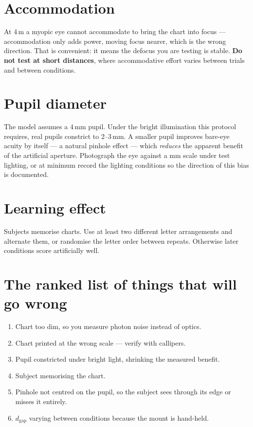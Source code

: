 \documentclass[11pt]{report}
\begin{document}
\section{Accommodation}

At 4\,m a myopic eye cannot accommodate to bring the chart into focus --- accommodation only adds
power, moving focus nearer, which is the wrong direction. That is convenient: it means the defocus
you are testing is stable. \textbf{Do not test at short distances}, where accommodative effort varies
between trials and between conditions.

\section{Pupil diameter}

The model assumes a 4\,mm pupil. Under the bright illumination this protocol requires, real pupils
constrict to 2--3\,mm. A smaller pupil improves bare-eye acuity by itself --- a natural pinhole
effect --- which \emph{reduces} the apparent benefit of the artificial aperture. Photograph the eye
against a mm scale under test lighting, or at minimum record the lighting conditions so the
direction of this bias is documented.

\section{Learning effect}

Subjects memorise charts. Use at least two different letter arrangements and alternate them, or
randomise the letter order between repeats. Otherwise later conditions score artificially well.

\section{The ranked list of things that will go wrong}

\begin{enumerate}[leftmargin=1.2cm]
\item Chart too dim, so you measure photon noise instead of optics.
\item Chart printed at the wrong scale --- verify with callipers.
\item Pupil constricted under bright light, shrinking the measured benefit.
\item Subject memorising the chart.
\item Pinhole not centred on the pupil, so the subject sees through its edge or misses it entirely.
\item $d_{\text{gap}}$ varying between conditions because the mount is hand-held.
\end{enumerate}
\end{document}
